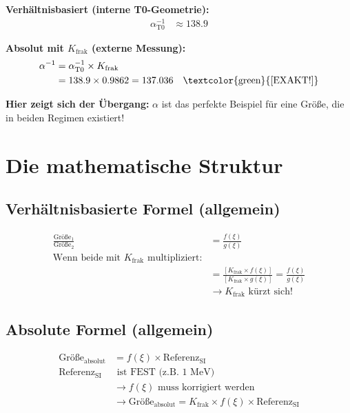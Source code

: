 	\textbf{Verhältnisbasiert (interne T0-Geometrie):}
	\begin{align*}
		\alpha_{\text{T0}}^{-1} &\approx 138.9
	\end{align*}
	
	\textbf{Absolut mit $K_{\text{frak}}$ (externe Messung):}
	\begin{align*}
		\alpha^{-1} &= \alpha_{\text{T0}}^{-1} \times K_{\text{frak}} \\
		&= 138.9 \times 0.9862 = 137.036 \quad \text{\textcolor{green}{[EXAKT!]}}
	\end{align*}
	
	\textbf{Hier zeigt sich der Übergang:} $\alpha$ ist das perfekte Beispiel für eine Größe, die in beiden Regimen existiert!
	
	\section{Die mathematische Struktur}
	
	\subsection{Verhältnisbasierte Formel (allgemein)}
	\begin{align*}
		\frac{\text{Größe}_1}{\text{Größe}_2} &= \frac{f(\xi)}{g(\xi)} \\
		\text{Wenn beide mit $K_{\text{frak}}$ multipliziert:} & \\
		&= \frac{[K_{\text{frak}} \times f(\xi)]}{[K_{\text{frak}} \times g(\xi)]} = \frac{f(\xi)}{g(\xi)} \\
		&\rightarrow K_{\text{frak}} \text{ kürzt sich!}
	\end{align*}
	
	\subsection{Absolute Formel (allgemein)}
	\begin{align*}
		\text{Größe}_{\text{absolut}} &= f(\xi) \times \text{Referenz}_{\text{SI}} \\
		\text{Referenz}_{\text{SI}} &\text{ ist FEST (z.B. 1 MeV)} \\
		&\rightarrow f(\xi) \text{ muss korrigiert werden} \\
		&\rightarrow \text{Größe}_{\text{absolut}} = K_{\text{frak}} \times f(\xi) \times \text{Referenz}_{\text{SI}}
	\end{align*}
	
